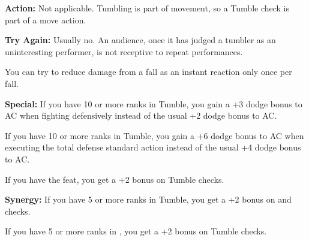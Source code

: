 \textbf{Action:} Not applicable. Tumbling is part of movement, so a Tumble check is part of a move action.

\textbf{Try Again:} Usually no. An audience, once it has judged a tumbler as an uninteresting performer, is not receptive to repeat performances.

You can try to reduce damage from a fall as an instant reaction only once per fall.

\textbf{Special:} If you have 10 or more ranks in Tumble, you gain a +3 dodge bonus to AC when fighting defensively instead of the usual +2 dodge bonus to AC.

If you have 10 or more ranks in Tumble, you gain a +6 dodge bonus to AC when executing the total defense standard action instead of the usual +4 dodge bonus to AC.

If you have the  feat, you get a +2 bonus on Tumble checks.

\textbf{Synergy:} If you have 5 or more ranks in Tumble, you get a +2 bonus on  and  checks.

If you have 5 or more ranks in , you get a +2 bonus on Tumble checks.
